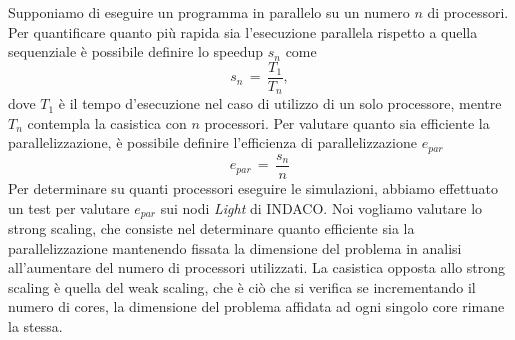 Supponiamo di eseguire un programma in parallelo su un numero $n$ di processori. Per quantificare quanto più rapida sia l'esecuzione parallela rispetto a quella sequenziale è possibile definire lo speedup $s_n$ come
\begin{equation}
s_n\,=\,\frac{T_1}{T_n},
\label{eq:speed_up}
\end{equation}
dove $T_1$ è il tempo d'esecuzione nel caso di utilizzo di un solo processore, mentre $T_n$ contempla la casistica con $n$ processori. Per valutare quanto sia efficiente la parallelizzazione, è possibile definire l'efficienza di parallelizzazione $e_{par}$
\begin{equation}
e_{par}\,=\,\frac{s_n}{n}
\label{eq:speed_up}
\end{equation}
Per determinare su quanti processori eseguire le simulazioni, abbiamo effettuato un test per valutare $e_{par}$ sui nodi \textit{Light} di INDACO.
Noi vogliamo valutare lo strong scaling, che consiste nel determinare quanto efficiente sia la parallelizzazione mantenendo fissata la dimensione del problema in analisi all'aumentare del numero di processori utilizzati.
La casistica opposta allo strong scaling è quella del weak scaling, che è ciò che si verifica se incrementando il numero di cores, la dimensione del problema affidata ad ogni singolo core rimane la stessa.


